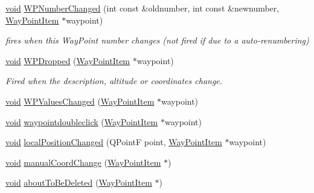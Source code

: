 \begin{DoxyCompactItemize}
\item 
\hyperlink{group___u_a_v_objects_plugin_ga444cf2ff3f0ecbe028adce838d373f5c}{void} \hyperlink{group___o_p_map_widget_ga259ccf14fc1866f99af110b4b0334d74}{\-W\-P\-Number\-Changed} (int const \&oldnumber, int const \&newnumber, \hyperlink{classmapcontrol_1_1_way_point_item}{\-Way\-Point\-Item} $\ast$waypoint)
\begin{DoxyCompactList}\small\item\em fires when this \-Way\-Point number changes (not fired if due to a auto-\/renumbering) \end{DoxyCompactList}\item 
\hyperlink{group___u_a_v_objects_plugin_ga444cf2ff3f0ecbe028adce838d373f5c}{void} \hyperlink{group___o_p_map_widget_gae08b9a33683cbdb80ac273d6dcd75837}{\-W\-P\-Dropped} (\hyperlink{classmapcontrol_1_1_way_point_item}{\-Way\-Point\-Item} $\ast$waypoint)
\begin{DoxyCompactList}\small\item\em \-Fired when the description, altitude or coordinates change. \end{DoxyCompactList}\item 
\hyperlink{group___u_a_v_objects_plugin_ga444cf2ff3f0ecbe028adce838d373f5c}{void} \hyperlink{group___o_p_map_widget_gac48456e8c6628a31dc82e235dbf94c2f}{\-W\-P\-Values\-Changed} (\hyperlink{classmapcontrol_1_1_way_point_item}{\-Way\-Point\-Item} $\ast$waypoint)
\item 
\hyperlink{group___u_a_v_objects_plugin_ga444cf2ff3f0ecbe028adce838d373f5c}{void} \hyperlink{group___o_p_map_widget_ga94099ae67d892548f27f41b816f4735f}{waypointdoubleclick} (\hyperlink{classmapcontrol_1_1_way_point_item}{\-Way\-Point\-Item} $\ast$waypoint)
\item 
\hyperlink{group___u_a_v_objects_plugin_ga444cf2ff3f0ecbe028adce838d373f5c}{void} \hyperlink{group___o_p_map_widget_gaa25d07c9de649428ed3dd38384048404}{local\-Position\-Changed} (\-Q\-Point\-F point, \hyperlink{classmapcontrol_1_1_way_point_item}{\-Way\-Point\-Item} $\ast$waypoint)
\item 
\hyperlink{group___u_a_v_objects_plugin_ga444cf2ff3f0ecbe028adce838d373f5c}{void} \hyperlink{group___o_p_map_widget_ga976918f8397d48a08ae2af24e0ab219c}{manual\-Coord\-Change} (\hyperlink{classmapcontrol_1_1_way_point_item}{\-Way\-Point\-Item} $\ast$)
\item 
\hyperlink{group___u_a_v_objects_plugin_ga444cf2ff3f0ecbe028adce838d373f5c}{void} \hyperlink{group___o_p_map_widget_ga7ab7e29d2f8728b8fb7e804f0f2a34ed}{about\-To\-Be\-Deleted} (\hyperlink{classmapcontrol_1_1_way_point_item}{\-Way\-Point\-Item} $\ast$)
\end{DoxyCompactItemize}
